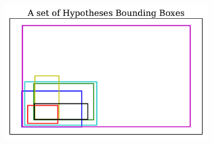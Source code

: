 \begin{figure}[hbt]
    \begin{subfigure}[b]{0.30\textwidth}
        \centering
        \includegraphics[width=\textwidth]{visBB}
        \caption{}
        \label{fig:slvqs_bb}
    \end{subfigure}%
    

\end{figure}
